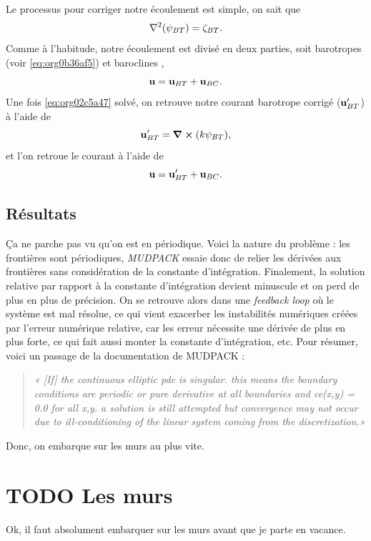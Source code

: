 \documentclass[10pt]{article}
\numberwithin{equation}{section}
\newcommand{\uu}{\vb{u}}
\begin{document}
Le processus pour corriger notre écoulement est simple, on sait que
\begin{equation}
\label{eq:org02c5a47}
   \laplacian(\psi_{BT}) = \zeta_{BT}.
\end{equation}
Comme à l'habitude, notre écoulement est divisé en deux parties, soit barotropes (voir \ref{eq:org0b36af5}) et baroclines ,
\begin{equation}
   \uu = \uu_{BT} + \uu_{BC}.
\end{equation}
Une fois \ref{eq:org02c5a47} solvé, on retrouve notre courant barotrope corrigé (\(\uu_{BT}'\)) à l'aide de
\begin{equation}
   \uu_{BT}' = \curl(k\psi_{BT}),
\end{equation}
et l'on retroue le courant à l'aide de
\begin{equation}
   \uu = \uu_{BT}' + \uu_{BC}.
\end{equation}


\subsection{Résultats}
\label{sec:orgc065ab9}
Ça ne parche pas vu qu'on est en périodique.
Voici la nature du problème : les frontières sont périodiques, \emph{MUDPACK} essaie donc de relier les dérivées aux frontières sans considération de la constante d'intégration.
Finalement, la solution relative par rapport à la constante d'intégration devient minuscule et on perd de plus en plus de précision.
On se retrouve alors dans une \emph{feedback loop} où le système est mal résolue, ce qui vient exacerber les instabilités numériques créées par l'erreur numérique relative, car les erreur nécessite une dérivée de plus en plus forte, ce qui fait aussi monter la constante d'intégration, etc.
Pour résumer, voici un passage de la documentation de MUDPACK :

\begin{quote}
\emph{« [If] the continuous elliptic pde is singular.  this means the boundary conditions are periodic or pure derivative at all boundaries and ce(x,y) = 0.0 for all x,y.  a solution is still attempted but convergence may not occur due to ill-conditioning of the linear system coming from the discretization.»}
\end{quote}

Donc, on embarque sur les murs au plus vite.

\section{{\bfseries\sffamily TODO} Les murs}
\label{sec:org505859b}
Ok, il faut absolument embarquer sur les murs avant que je parte en vacance.
\end{document}
